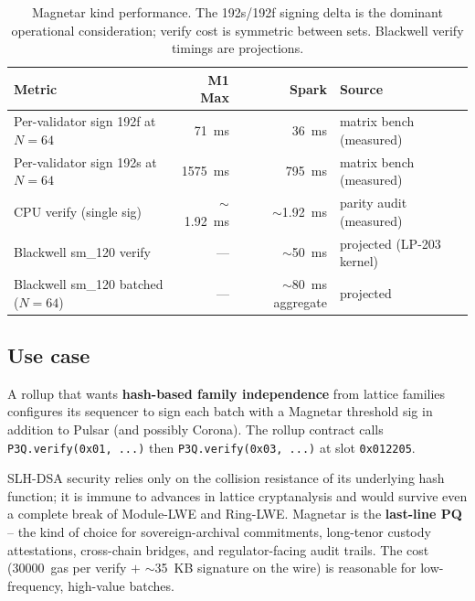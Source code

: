 \begin{table}[h]
\centering
\small
\begin{tabular}{@{}lrrl@{}}
\toprule
\textbf{Metric} & \textbf{M1 Max} & \textbf{Spark} & \textbf{Source} \\
\midrule
Per-validator sign 192f at $N{=}64$ & \SI{71}{\milli\second} & \SI{36}{\milli\second} & matrix bench (measured)~\cite{parityaudit} \\
Per-validator sign 192s at $N{=}64$ & \SI{1575}{\milli\second} & \SI{795}{\milli\second} & matrix bench (measured) \\
CPU verify (single sig) & $\sim$\SI{1.92}{\milli\second} & $\sim$\SI{1.92}{\milli\second} & parity audit (measured) \\
Blackwell sm\_120 verify & --- & $\sim$\SI{50}{\milli\second} & projected (LP-203 kernel)~\cite{lp203} \\
Blackwell sm\_120 batched ($N{=}64$) & --- & $\sim$\SI{80}{\milli\second} aggregate & projected \\
\bottomrule
\end{tabular}
\caption{Magnetar kind performance. The 192s/192f signing
delta is the dominant operational consideration; verify cost is
symmetric between sets. Blackwell verify timings are
projections.}
\label{tab:magnetar-perf}
\end{table}

\subsection{Use case}

A rollup that wants \textbf{hash-based family independence}
from lattice families configures its sequencer to sign each
batch with a Magnetar threshold sig in addition to Pulsar (and
possibly Corona). The rollup contract calls
\texttt{P3Q.verify(0x01, ...)} then \texttt{P3Q.verify(0x03, ...)}
at slot \texttt{0x012205}.

SLH-DSA security relies only on the collision resistance of its
underlying hash function; it is immune to advances in lattice
cryptanalysis and would survive even a complete break of
Module-LWE and Ring-LWE. Magnetar is the \textbf{last-line PQ}
-- the kind of choice for sovereign-archival commitments,
long-tenor custody attestations, cross-chain bridges, and
regulator-facing audit trails. The cost (\SI{30000}{gas} per
verify $+$ $\sim$\SI{35}{KB} signature on the wire) is
reasonable for low-frequency, high-value batches.
